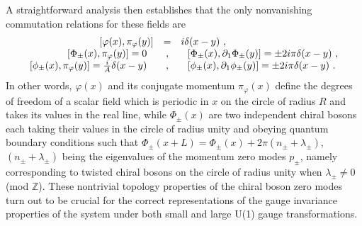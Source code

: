 \documentclass[a4paper,11pt]{article}
\def\Z{\mathbb Z}
\begin{document}
A straightforward analysis then establishes that the only nonvanishing
commutation relations for these fields are
\begin{equation}
\begin{array}{r c l}
\left[\varphi(x),\pi_\varphi(y)\right]&=&i\delta(x-y)\ ,\\
\left[\Phi_\pm(x),\pi_\varphi(y)\right]=0\ \ &,&\ \ 
\left[\Phi_\pm(x),\partial_1\Phi_\pm(y)\right]=\pm 2i\pi\delta(x-y)\ ,\\
\left[\phi_\pm(x),\pi_\varphi(y)\right]=\frac{i}{A}\delta(x-y)\ \ &,&\ \
\left[\phi_\pm(x),\partial_1\phi_\pm(y)\right]=\pm 2i\pi\delta(x-y)\ .
\end{array}
\label{eq:commutations2}
\end{equation}
In other words, $\varphi(x)$ and its conjugate momentum
$\pi_\varphi(x)$ define the degrees of freedom of a scalar field
which is periodic in $x$ on the circle of radius $R$ and takes its values
in the real line, while $\Phi_\pm(x)$ are two independent chiral bosons
each taking their values in the circle of radius unity and obeying
quantum boundary conditions such that 
$\Phi_\pm(x+L)=\Phi_\pm(x)+2\pi(n_\pm+\lambda_\pm)$, $(n_\pm+\lambda_\pm)$
being the eigenvalues of the momentum zero modes $p_\pm$, namely corresponding
to twisted chiral bosons on the circle of radius unity when 
$\lambda_\pm\ne 0$ (mod $\Z$).
These nontrivial topology properties of the chiral boson zero modes turn out 
to be crucial for the correct representations of the gauge invariance 
properties of the system under both small and large U(1) gauge transformations.
\end{document}

